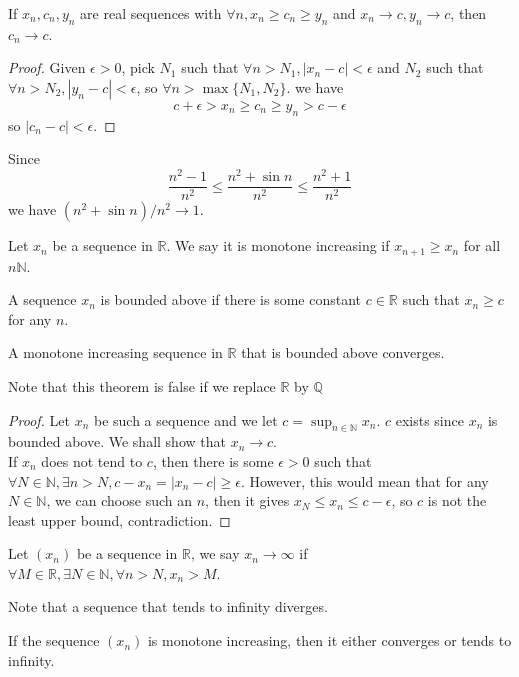 \begin{proposition}
    If $x_n,c_n,y_n$ are real sequences with $\forall n,x_n\ge c_n\ge y_n$ and $x_n\to c,y_n\to c$, then $c_n\to c$.
\end{proposition}
\begin{proof}
    Given $\epsilon>0$, pick $N_1$ such that $\forall n>N_1,|x_n-c|<\epsilon$ and $N_2$ such that $\forall n>N_2,|y_n-c|<\epsilon$, so $\forall n>\max\{N_1,N_2\}$. we have
    $$c+\epsilon>x_n\ge c_n\ge y_n>c-\epsilon$$
    so $|c_n-c|<\epsilon$.
\end{proof}
\begin{example}
    Since
    $$\frac{n^2-1}{n^2}\le\frac{n^2+\sin n}{n^2}\le\frac{n^2+1}{n^2}$$
    we have $(n^2+\sin n)/n^2\to 1$.
\end{example}
\begin{definition}
    Let $x_n$ be a sequence in $\mathbb R$.
    We say it is monotone increasing if $x_{n+1}\ge x_n$ for all $n\mathbb N$.
\end{definition}
\begin{definition}
    A sequence $x_n$ is bounded above if there is some constant $c\in\mathbb R$ such that $x_n\ge c$ for any $n$.
\end{definition}
\begin{theorem}
    A monotone increasing sequence in $\mathbb R$ that is bounded above converges.
\end{theorem}
Note that this theorem is false if we replace $\mathbb R$ by $\mathbb Q$
\begin{proof}
    Let $x_n$ be such a sequence and we let $c=\sup_{n\in\mathbb N}x_n$.
    $c$ exists since $x_n$ is bounded above.
    We shall show that $x_n\to c$.\\
    If $x_n$ does not tend to $c$, then there is some $\epsilon>0$ such that $\forall N\in\mathbb N,\exists n>N,c-x_n=|x_n-c|\ge\epsilon$.
    However, this would mean that for any $N\in\mathbb N$, we can choose such an $n$, then it gives $x_N\le x_n\le c-\epsilon$, so $c$ is not the least upper bound, contradiction.
\end{proof}
\begin{definition}
    Let $(x_n)$ be a sequence in $\mathbb R$, we say $x_n\to\infty$ if $\forall M\in\mathbb R,\exists N\in\mathbb N,\forall n>N,x_n>M$.
\end{definition}
Note that a sequence that tends to infinity diverges.
\begin{proposition}
    If the sequence $(x_n)$ is monotone increasing, then it either converges or tends to infinity.
\end{proposition}
